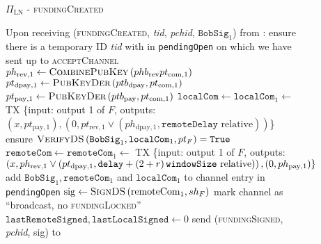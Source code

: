   \begin{figure}[H]
    \begin{protocolbox}{$\Pi_{\mathrm{LN}}$ - \textsc{fundingCreated}}
      \begin{algorithmic}[1]
        \State Upon receiving (\textsc{fundingCreated}, \textit{tid},
        \textit{pchid}, $\mathtt{BobSig}_1$) from \bob:
        \Indent
          \State ensure there is a temporary ID \textit{tid} with \bob{} in
          \texttt{pendingOpen} on which we have sent up to
          \textsc{acceptChannel}
          \State $ph_{\mathrm{rev}, 1} \gets
          \textsc{CombinePubKey}\left(phb_{\mathrm{rev}} pt_{\mathrm{com},
          1}\right)$
          \State $pt_{\mathrm{dpay}, 1} \gets
          \textsc{PubKeyDer}\left(ptb_{\mathrm{dpay}}, pt_{\mathrm{com},
          1}\right)$
          \State $pt_{\mathrm{pay}, 1} \gets
          \textsc{PubKeyDer}\left(ptb_{\mathrm{pay}}, pt_{\mathrm{com},
          1}\right)$
          \State $\mathtt{localCom} \gets \mathtt{localCom}_1 \gets$ TX \{input:
          output 1 of $F$, outputs: $\left(x, pt_{\mathrm{pay}, 1}\right),
          \left(0, pt_{\mathrm{rev}, 1} \vee \left(ph_{\mathrm{dpay}, 1},
          \mathtt{remoteDelay} \text{ relative}\right)\right)$\}
          \State ensure $\textsc{VerifyDS}\left(\mathtt{BobSig}_1,
          \mathtt{localCom}_1, pt_F\right) = \mathtt{True}$
          \State $\mathtt{remoteCom} \gets \mathtt{remoteCom}_1 \gets$ TX
          \{input: output 1 of $F$, outputs: $\left(x, ph_{\mathrm{rev}, 1} \vee
          \left(pt_{\mathrm{dpay}, 1}, \mathtt{delay} + \left(2 + r\right)\texttt{windowSize}{} \text{
          relative}\right)\right), \left(0, ph_{\mathrm{pay}, 1}\right)\}$
          \State add $\mathtt{BobSig}_1, \mathtt{remoteCom}_1$ and
          $\mathtt{localCom}_1$ to channel entry in \texttt{pendingOpen}
          \State $\mathrm{sig} \gets \textsc{SignDS}\left(\mathrm{remoteCom}_1,
          sh_F\right)$
          \State mark channel as ``broadcast, no \textsc{fundingLocked}''
          \label{alg:protocol:open:fundingCreated:mark}
          \State $\mathtt{lastRemoteSigned}, \mathtt{lastLocalSigned} \gets 0$
          \State send (\textsc{fundingSigned}, \textit{pchid}, sig) to \bob{}
        \EndIndent
      \end{algorithmic}
    \end{protocolbox}
    \caption{}
    \label{alg:protocol:open:fundingCreated}
  \end{figure}

